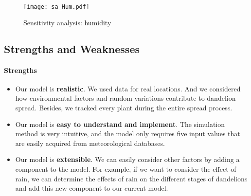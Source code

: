 \documentclass[12pt]{article}
\begin{document}
			\begin{figure}[htbp]
				\centering
				\texttt{[image: sa\_Hum.pdf]}
				\caption{Sensitivity analysis: humidity}
				\label{fig:saH}
			\end{figure}
			
			
			
		\subsection{Strengths and Weaknesses}
		
			\paragraph{Strengths}
			\vspace{-0.1cm}
			\begin{itemize}
				\vspace{-0.3cm}
				\item Our model is \textbf{realistic}.  We used data for real locations.  And we considered how environmental factors and random variations contribute to dandelion spread.  Besides, we tracked every plant during the entire spread process.  
				
				\vspace{-0.3cm}
				\item Our model is \textbf{easy to understand and implement}.  The simulation method is very intuitive, and the model only requires five input values that are easily acquired from meteorological databases.
				
				\vspace{-0.3cm}
				\item Our model is \textbf{extensible}.  We can easily consider other factors by adding a component to the model.  For example, if we want to consider the effect of rain, we can determine the effects of rain on the different stages of dandelions and add this new component to our current model.
			\end{itemize}
			
\end{document}
